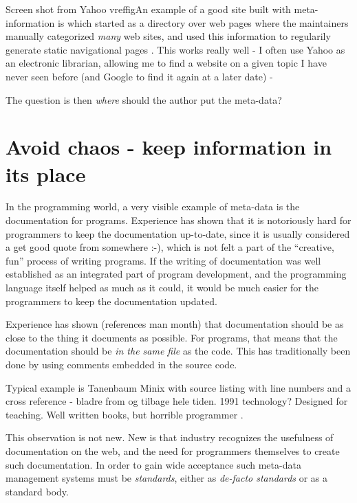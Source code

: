 \textsf{Screen shot from Yahoo} \textsf{vref{fig}}An example of a good
site built with meta-information is
 which started as a directory over
web pages where the maintainers manually categorized \textit{many} web
sites, and used this information to regularily generate static
navigational pages .  This works really well - I often use Yahoo as an
electronic librarian, allowing me to find a website on a given topic I
have never seen before (and Google to find it again at a later date) - 

The question is then \textit{where} should the author put the meta-data?

\section{Avoid chaos - keep information in its place}

In the programming world, a very visible example of meta-data is the
documentation for programs.  Experience has shown that it is
notoriously hard for programmers to keep the documentation up-to-date,
since it is usually considered a \textsf{get good quote from somewhere
  :-)}, which is not felt a part of the ``creative, fun'' process of
writing programs.  If the writing of documentation was well
established as an integrated part of program development, and the
programming language itself helped as much as it could, it would be
much easier for the programmers to keep the documentation updated.

Experience has shown (\textsf{references} man month) that
documentation should be as close to the thing it documents as
possible.  For programs, that means that the documentation should be
\textit{in the same file} as the code.  This has traditionally been
done by using comments embedded in the source code.


\textsf{Typical example is Tanenbaum Minix with source listing with
  line numbers and a cross reference - bladre from og tilbage hele
  tiden.  1991 technology?  Designed for teaching.  Well written
  books, but horrible programmer \cite{tanenbaumoperatingsystems}}.

This observation is not new.  \textsf{New is that industry recognizes
  the usefulness of documentation on the web, and the need for
  programmers themselves to create such documentation.  In order to
  gain wide acceptance such meta-data management systems must be
  \textit{standards}, either as \textit{de-facto standards} or as a
  standard body.  }

